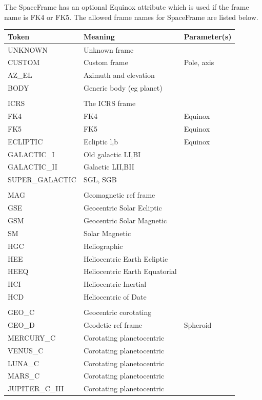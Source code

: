 \documentclass[11pt]{article}
\begin{document}
The SpaceFrame has an optional Equinox attribute which is used
if the frame name is FK4 or FK5. The allowed frame names for
SpaceFrame are listed below.

\begin{table}[h]
\small
\begin{tabular}{|lll|}
\hline
Token  &  Meaning & Parameter(s) \\
\hline
UNKNOWN  & Unknown frame & \\
CUSTOM  & Custom frame & Pole, axis \\
AZ\_EL   & Azimuth and elevation & \\
BODY    & Generic body (eg planet) & \\
&&\\
ICRS  & The ICRS frame & \\
FK4  &   FK4     &  Equinox \\
FK5  &   FK5      & Equinox\\
ECLIPTIC& Ecliptic l,b & Equinox\\
GALACTIC\_I& Old galactic LI,BI & \\
GALACTIC\_II& Galactic LII,BII  & \\
SUPER\_GALACTIC& SGL, SGB   & \\
&&\\
MAG   & Geomagnetic ref frame & \\
GSE   & Geocentric Solar Ecliptic  &\\
GSM  & Geocentric Solar Magnetic &\\
SM   & Solar Magnetic & \\
HGC & Heliographic  & \\
HEE  & Heliocentric Earth Ecliptic & \\
HEEQ & Heliocentric Earth Equatorial & \\
HCI  & Heliocentric Inertial & \\
HCD  & Heliocentric of Date & \\
&&\\
GEO\_C  & Geocentric corotating & \\
GEO\_D  & Geodetic ref frame  & Spheroid\\
MERCURY\_C & Corotating planetocentric & \\
VENUS\_C & Corotating planetocentric & \\
LUNA\_C & Corotating planetocentric & \\
MARS\_C & Corotating planetocentric & \\
JUPITER\_C\_III & Corotating planetocentric & \\

\end{tabular}
\end{table}
\end{document}
